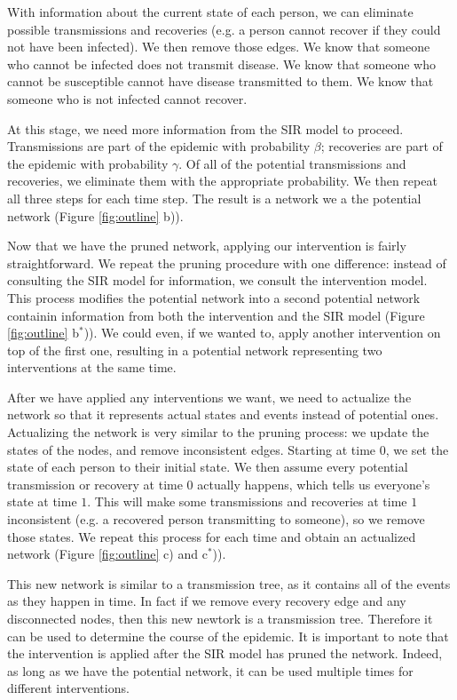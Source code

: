 \documentclass[PTRSB]{rsos}
\begin{document}
With information about the current state of each person, we can eliminate possible transmissions and recoveries (e.g. a person cannot recover if they could not have been infected).
We then remove those edges.
We know that someone who cannot be infected does not transmit disease.
We know that someone who cannot be susceptible cannot have disease transmitted to them.
We know that someone who is not infected cannot recover.

At this stage, we need more information from the SIR model to proceed.
Transmissions are part of the epidemic with probability $\beta$; recoveries are part of the epidemic with probability $\gamma$.
Of all of the potential transmissions and recoveries, we eliminate them with the appropriate probability.
We then repeat all three steps for each time step.
The result is a network we a the potential network (Figure \ref{fig:outline} b)).

Now that we have the pruned network, applying our intervention is fairly straightforward.
We repeat the pruning procedure with one difference: instead of consulting the SIR model for information, we consult the intervention model.
This process modifies the potential network into a second potential network containin information from both the intervention and the SIR model (Figure \ref{fig:outline} b${}^*$)).
We could even, if we wanted to, apply another intervention on top of the first one, resulting in a potential network representing two interventions at the same time.

After we have applied any interventions we want, we need to actualize the network so that it represents actual states and events instead of potential ones.
Actualizing the network is very similar to the pruning process: we update the states of the nodes, and remove inconsistent edges.
Starting at time $0$, we set the state of each person to their initial state.
We then assume every potential transmission or recovery at time $0$ actually happens, which tells us everyone's state at time $1$.
This will make some transmissions and recoveries at time $1$ inconsistent (e.g. a recovered person transmitting to someone), so we remove those states.
We repeat this process for each time and obtain an actualized network (Figure \ref{fig:outline} c) and c${}^*$)).

This new network is similar to a transmission tree, as it contains all of the events as they happen in time.
In fact if we remove every recovery edge and any disconnected nodes, then this new newtork is a transmission tree.
Therefore it can be used to determine the course of the epidemic.
It is important to note that the intervention is applied after the SIR model has pruned the network.
Indeed, as long as we have the potential network, it can be used multiple times for different interventions.
\end{document}

